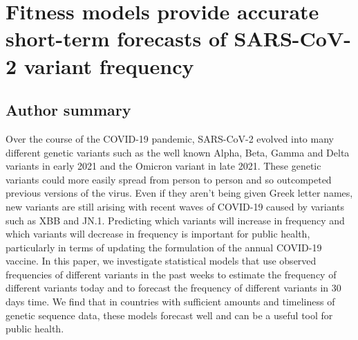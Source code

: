 \graphicspath{{./chapters/ncov-forecasting-fit/}}

\chapter{Fitness models provide accurate short-term forecasts of SARS-CoV-2 variant frequency}

\section*{Author summary}

Over the course of the COVID-19 pandemic, SARS-CoV-2 evolved into many different genetic variants such as the well known Alpha, Beta, Gamma and Delta variants in early 2021 and the Omicron variant in late 2021.
These genetic variants could more easily spread from person to person and so outcompeted previous versions of the virus. Even if they aren’t being given Greek letter names, new variants are still arising with recent waves of COVID-19 caused by variants such as XBB and JN.1.
Predicting which variants will increase in frequency and which variants will decrease in frequency is important for public health, particularly in terms of updating the formulation of the annual COVID-19 vaccine.
In this paper, we investigate statistical models that use observed frequencies of different variants in the past weeks to estimate the frequency of different variants today and to forecast the frequency of different variants in 30 days time.
We find that in countries with sufficient amounts and timeliness of genetic sequence data, these models forecast well and can be a useful tool for public health.

